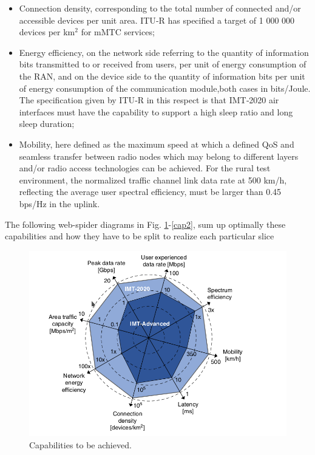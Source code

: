 \documentclass[a4paper,12pt]{report} %
\begin{document}
\begin{itemize}
\item Connection density, corresponding to the total number of connected and/or accessible devices
per unit area. ITU‐R has specified a target of 1 000 000 devices per km$^2$ for mMTC services;
\end{itemize}
\begin{itemize}
\item Energy efficiency, on the network side referring to the quantity of information bits transmitted to or received from users, per unit of energy consumption of the RAN, and on the device side to the
quantity of information bits per unit of energy consumption of the communication module,both cases in bits/Joule. The specification given by ITU‐R in this respect is that IMT‐2020 air interfaces must have the capability to support a high sleep ratio and long sleep duration;
\end{itemize}
\begin{itemize}
\item Mobility, here defined as the maximum speed at which a defined QoS and
seamless transfer between radio nodes which may belong to different layers and/or radio access
technologies can be achieved. For the rural test environment, the normalized traffic channel link
data rate at 500 km/h, reflecting the average user spectral efficiency, must be larger than 0.45 bps/Hz
in the uplink.
\end{itemize}
The following web-spider diagrams in Fig. \ref{cap1}-\ref{cap2}, sum up optimally these capabilities and how they have to be split to realize each particular slice
\begin{figure}[h]
\centering
\includegraphics[scale=0.4]{pics/capabilities1.png}
\caption{Capabilities to be achieved. \cite{al20185g}} 
\label{cap1}
\end{figure}
\end{document}
